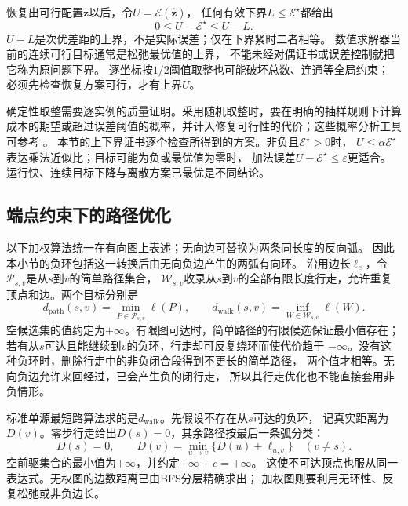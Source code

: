 恢复出可行配置\(\widehat{\bm z}\)以后，令\(U=\mathcal E(\widehat{\bm z})\)，
任何有效下界\(L\leq\mathcal E^\star\)都给出
\[
  0\leq U-\mathcal E^\star\leq U-L.
\]
\(U-L\)是次优差距的上界，不是实际误差；仅在下界紧时二者相等。
数值求解器当前的连续可行目标通常是松弛最优值的上界，
不能未经对偶证书或误差控制就把它称为原问题下界。
逐坐标按\(1/2\)阈值取整也可能破坏总数、连通等全局约束；
必须先检查恢复方案可行，才有上界\(U\)。

确定性取整需要逐实例的质量证明。采用随机取整时，要在明确的抽样规则下计算
成本的期望或超过误差阈值的概率，并计入修复可行性的代价；这些概率分析工具可参考
。
本节的上下界证书逐个检查所得到的方案。非负且\(\mathcal E^\star>0\)时，
\(U\leq\alpha\mathcal E^\star\)表达乘法近似比；目标可能为负或最优值为零时，
加法误差\(U-\mathcal E^\star\leq\varepsilon\)更适合。
运行快、连续目标下降与离散方案已最优是不同结论。

\subsection{端点约束下的路径优化}
\label{sec:graph-theory-shortest-paths}

以下加权算法统一在有向图上表述；无向边可替换为两条同长度的反向弧。
因此本小节的负环包括这一转换后由无向负边产生的两弧有向环。
沿用边长\(\ell_e\)，令\(\mathcal P_{s,v}\)是从\(s\)到\(v\)的简单路径集合，
\(\mathcal W_{s,v}\)收录从\(s\)到\(v\)的全部有限长度行走，允许重复顶点和边。两个目标分别是
\[
  d_{\mathrm{path}}(s,v)=\min_{P\in\mathcal P_{s,v}}\ell(P),
  \qquad
  d_{\mathrm{walk}}(s,v)=\inf_{W\in\mathcal W_{s,v}}\ell(W).
\]
空候选集的值约定为\(+\infty\)。有限图可达时，简单路径的有限候选保证最小值存在；
若有从\(s\)可达且能继续到\(v\)的负环，行走却可反复绕环而使代价趋于
\(-\infty\)。没有这种负环时，删除行走中的非负闭合段得到不更长的简单路径，
两个值才相等。无向负边允许来回经过，已会产生负的闭行走，
所以其行走优化也不能直接套用非负情形。

标准单源最短路算法求的是\(d_{\mathrm{walk}}\)。先假设不存在从\(s\)可达的负环，
记真实距离为\(D(v)\)。零步行走给出\(D(s)=0\)，其余路径按最后一条弧分类：
\begin{equation}
  D(s)=0,\qquad
  D(v)=\min_{u\to v}\{D(u)+\ell_{u,v}\}\quad(v\neq s).
  \label{eq:graph-theory-shortest-path-bellman}
\end{equation}
空前驱集合的最小值为\(+\infty\)，并约定\(+\infty+c=+\infty\)。
这使不可达顶点也服从同一表达式。无权图的边数距离已由BFS分层精确求出；
加权图则要利用无环性、反复松弛或非负边长。

